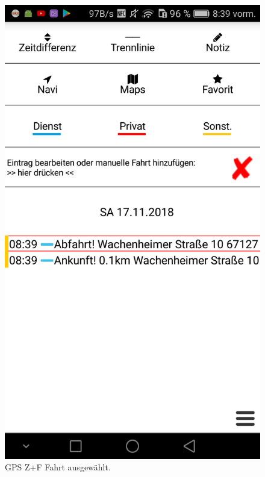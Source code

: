 \documentclass[a4paper]{article}
\begin{document}
\begin{figure}[H]
\begin{minipage}[b]{.4\linewidth}
        \includegraphics[scale=0.14]{img/gps2}
        \caption{\label{img:img/gps2}GPS Z+F Fahrt ausgewählt.}
    \end{minipage}
\end{figure}
\end{document}
